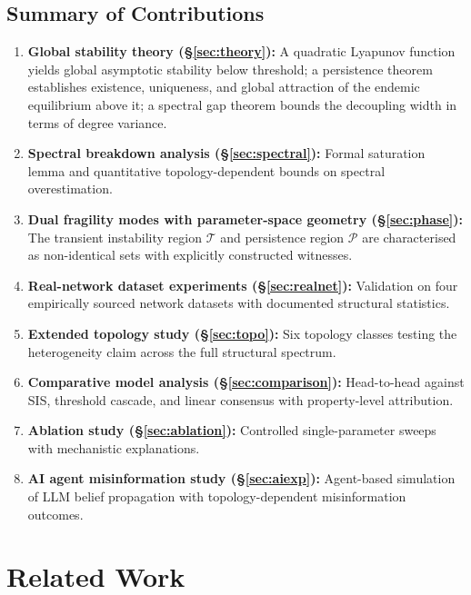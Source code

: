 \documentclass[10pt,twocolumn]{article}
\theoremstyle{myproof}
\newcommand{\calT}{\mathcal{T}}
\newcommand{\calP}{\mathcal{P}}
\begin{document}
\subsection{Summary of Contributions}
\begin{enumerate}
  \item \textbf{Global stability theory (\S\ref{sec:theory}):} A quadratic Lyapunov function
        yields global asymptotic stability below threshold; a persistence theorem establishes
        existence, uniqueness, and global attraction of the endemic equilibrium above it; a
        spectral gap theorem bounds the decoupling width in terms of degree variance.
  \item \textbf{Spectral breakdown analysis (\S\ref{sec:spectral}):} Formal saturation lemma
        and quantitative topology-dependent bounds on spectral overestimation.
  \item \textbf{Dual fragility modes with parameter-space geometry (\S\ref{sec:phase}):}
        The transient instability region $\calT$ and persistence region $\calP$ are characterised
        as non-identical sets with explicitly constructed witnesses.
  \item \textbf{Real-network dataset experiments (\S\ref{sec:realnet}):} Validation on four
        empirically sourced network datasets with documented structural statistics.
  \item \textbf{Extended topology study (\S\ref{sec:topo}):} Six topology classes testing
        the heterogeneity claim across the full structural spectrum.
  \item \textbf{Comparative model analysis (\S\ref{sec:comparison}):} Head-to-head against
        SIS, threshold cascade, and linear consensus with property-level attribution.
  \item \textbf{Ablation study (\S\ref{sec:ablation}):} Controlled single-parameter sweeps
        with mechanistic explanations.
  \item \textbf{AI agent misinformation study (\S\ref{sec:aiexp}):} Agent-based simulation
        of LLM belief propagation with topology-dependent misinformation outcomes.
\end{enumerate}

\section{Related Work}
\label{sec:related}
\end{document}
